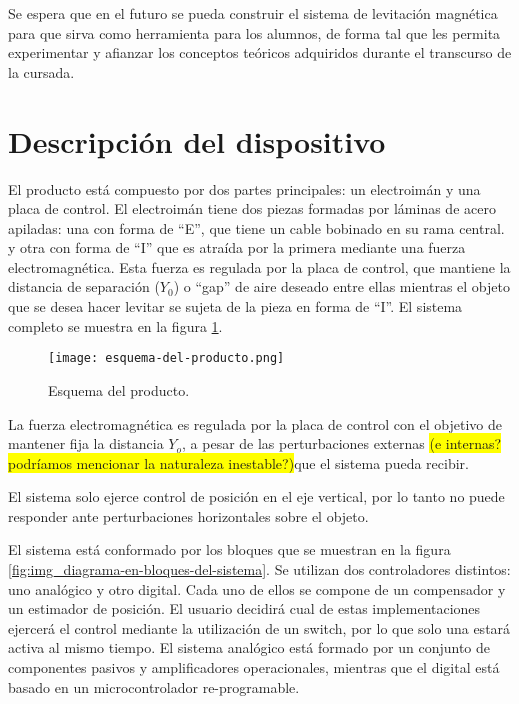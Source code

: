 \noindent Se espera que en el futuro se pueda construir el sistema de levitación magnética para que sirva como herramienta para los alumnos, de forma tal que les permita experimentar y afianzar los conceptos teóricos adquiridos durante el transcurso de la cursada.



\section{Descripción del dispositivo}

\noindent El producto está compuesto por dos partes principales: un electroimán y una placa de control. El electroimán tiene dos piezas formadas por láminas de acero apiladas: una con forma de “E”, que tiene un cable bobinado en su rama central. y otra con forma de “I” que es atraída por la primera mediante una fuerza electromagnética. Esta fuerza es regulada por la placa de control, que mantiene la distancia de separación ($Y_0$) o “gap” de aire deseado entre ellas mientras el objeto que se desea hacer levitar se sujeta de la pieza en forma de “I”. El sistema completo se muestra en la figura \ref{fig:img_Esquema-del-producto}.

\begin{figure}[H]
	\centering
	\texttt{[image: esquema-del-producto.png]}
	\caption{Esquema del producto.}
	\label{fig:img_Esquema-del-producto}
\end{figure}

\noindent La fuerza electromagnética es regulada por la placa de control con el objetivo de mantener fija la distancia $Y_{o}$, a pesar de las perturbaciones externas \colorbox{yellow}{(e internas? podríamos mencionar la naturaleza inestable?)}que el sistema pueda recibir. 


\noindent El sistema solo ejerce control de posición en el eje vertical, por lo tanto no puede responder ante perturbaciones horizontales sobre el objeto.


\noindent El sistema está conformado por los bloques que se muestran en la figura \ref{fig:img_diagrama-en-bloques-del-sistema}. Se utilizan dos controladores distintos: uno analógico y otro digital. Cada uno de ellos se compone de un compensador y un estimador de posición.  El usuario decidirá cual de estas implementaciones ejercerá el control mediante la utilización de un switch, por lo que solo una estará activa al mismo tiempo. El sistema analógico está formado por un conjunto de componentes pasivos y amplificadores operacionales, mientras que el digital está basado en un microcontrolador re-programable.

